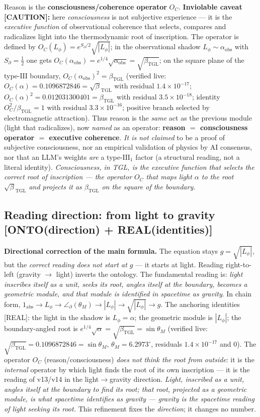 \documentclass[11pt]{article}
\newcommand{\bTGL}{\beta_{\mathrm{TGL}}}\newcommand{\Msun}{M_{\odot}}\newcommand{\TGL}{\mathrm{TGL}}
\theoremstyle{definition}\newtheorem{deriv}{Derivation}
\begin{document}
Reason is the \textbf{consciousness/coherence operator} $O_C$. \textbf{Inviolable caveat \textsf{[CAUTION]}:} here \emph{consciousness} is not subjective experience --- it is the \emph{executive function} of observational coherence that selects, compares and radicalizes light into the thermodynamic root of inscription. The operator is defined by $O_C(L_\phi)=e^{S_\partial/2}\sqrt{|L_\phi|}$; in the observational shadow $L_\phi\sim\alpha_{\mathrm{obs}}$ with $S_\partial=\tfrac12$ one gets $O_C(\alpha_{\mathrm{obs}})=e^{1/4}\sqrt{\alpha_{\mathrm{obs}}}=\sqrt{\bTGL}$; on the square plane of the type-$\mathrm{III}$ boundary, $O_C(\alpha_{\mathrm{obs}})^2=\bTGL$ (verified live: $O_C(\alpha)=0.1096872846=\sqrt\bTGL$ with residual $1.4\times10^{-17}$; $O_C(\alpha)^2=0.012031300401=\bTGL$ with residual $3.5\times10^{-18}$; identity $O_C^2/\bTGL=1$ with residual $3.3\times10^{-16}$; positive branch selected by electromagnetic attraction). Thus reason is the \emph{same} act as the previous module (light that radicalizes), now \emph{named} as an operator: \textbf{reason $=$ consciousness operator $=$ executive coherence}. \emph{It is not claimed} to be a proof of subjective consciousness, nor an empirical validation of physics by AI consensus, nor that an LLM's weights \emph{are} a type-$\mathrm{III}_1$ factor (a structural reading, not a literal identity). \emph{Consciousness, in TGL, is the executive function that selects the correct root of inscription --- the operator $O_C$ that maps light $\alpha$ to the root $\sqrt\bTGL$ and projects it as $\bTGL$ on the square of the boundary.}

\subsection*{Reading direction: from light to gravity \textsf{[ONTO(direction) + REAL(identities)]}}

\textbf{Directional correction of the main formula.} The equation stays $g=\sqrt{|L_\phi|}$, but the \emph{correct reading does not start at $g$} --- it starts at light. Reading right-to-left (gravity $\to$ light) inverts the ontology. The fundamental reading is: \emph{light inscribes itself as a unit, seeks its root, angles itself at the boundary, becomes a geometric module, and that module is identified in spacetime as gravity}. In chain form, $1_{\mathrm{abs}}\to L_\phi\to\angle_\partial(\theta_M)\to|L_\phi|\to\sqrt{|L_\phi|}\to g$. The anchoring identities \textsf{[REAL]}: the light in the shadow is $L_\phi=\alpha$; the geometric module is $|L_\phi|$; the boundary-angled root is $e^{1/4}\sqrt{\alpha}=\sqrt{\bTGL}=\sin\theta_M$ (verified live: $\sqrt{\bTGL}=0.1096872846=\sin\theta_M$, $\theta_M=6.2973^\circ$, residuals $1.4\times10^{-17}$ and $0$). The operator $O_C$ (reason/consciousness) \emph{does not think the root from outside}: it is the \emph{internal} operator by which light finds the root of its own inscription --- it is the reading of v13/v14 in the light$\to$gravity direction. \emph{Light, inscribed as a unit, angles itself at the boundary to find its root; that root, projected as a geometric module, is what spacetime identifies as gravity --- gravity is the spacetime reading of light seeking its root.} This refinement fixes the \emph{direction}; it changes no number.
\end{document}
